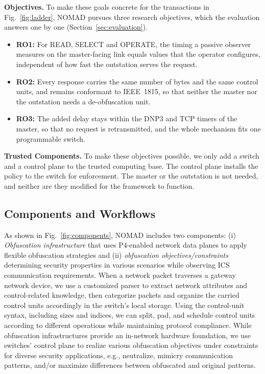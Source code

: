 \textbf{Objectives.} To make these goals concrete for the transactions in Fig.~\ref{fig:ladder}, NOMAD pursues three research objectives, which the evaluation answers one by one (Section~\ref{sec:evaluation}).
\begin{itemize}[leftmargin=*,labelindent=0pt,topsep=2pt,itemsep=1pt,parsep=0pt]
\item \textbf{RO1:} For READ, SELECT and OPERATE, the timing a passive observer measures on the master-facing link equals values that the operator configures, independent of how fast the outstation serves the request.
\item \textbf{RO2:} Every response carries the same number of bytes and the same control units, and remains conformant to IEEE~1815, so that neither the master nor the outstation needs a de-obfuscation unit.
\item \textbf{RO3:} The added delay stays within the DNP3 and TCP timers of the master, so that no request is retransmitted, and the whole mechanism fits one programmable switch.
\end{itemize}

\textbf{Trusted Components.} To make these objectives possible, we only add a switch and a control plane to the trusted computing base. The control plane installs the policy to the switch for enforcement. The master or the outstation is not needed, and neither are they modified for the framework to function.

\subsection{Components and Workflows}

As shown in Fig.~\ref{fig:components}, NOMAD includes two components: (i) \textit{Obfuscation infrastructure} that uses P4-enabled network data planes to apply flexible obfuscation strategies and (ii) \textit{obfuscation objectives/constraints} determining security properties in various scenarios while observing ICS communication requirements. When a network packet traverses a gateway network device, we use a customized parser to extract network attributes and control-related knowledge, then categorize packets and organize the carried control units accordingly in the switch's local storage. Using the control-unit syntax, including sizes and indices, we can split, pad, and schedule control units according to different operations while maintaining protocol compliance. While obfuscation infrastructures provide an in-network hardware foundation, we use switches' control plane to realize various obfuscation objectives under constraints for diverse security applications, e.g., neutralize, mimicry communication patterns, and/or maximize differences between obfuscated and original patterns.  

